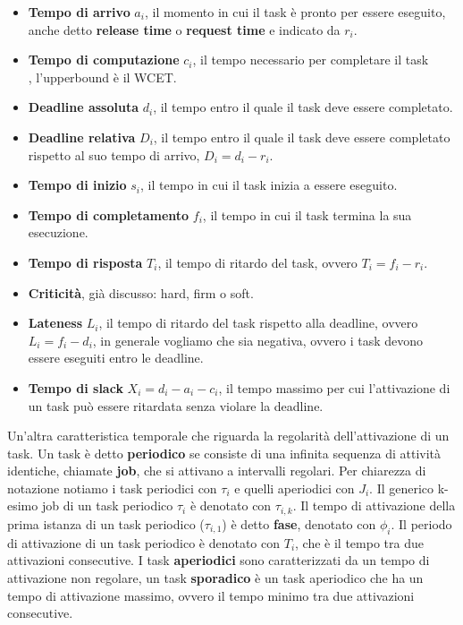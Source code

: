 \documentclass[12pt,openany,onesided]{book}
\begin{document}
\begin{itemize}
    \item \textbf{Tempo di arrivo} $a_i$, il momento in cui il task è pronto per essere eseguito, anche detto \textbf{release time} o \textbf{request time} e indicato da $r_i$.
    \item \textbf{Tempo di computazione} $c_i$, il tempo necessario per completare il task\\ , l'upperbound è il WCET.
    \item \textbf{Deadline assoluta} $d_i$, il tempo entro il quale il task deve essere completato.
    \item \textbf{Deadline relativa} $D_i$, il tempo entro il quale il task deve essere completato rispetto al suo tempo di arrivo, $D_i=d_i-r_i$.
    \item \textbf{Tempo di inizio} $s_i$, il tempo in cui il task inizia a essere eseguito.
    \item \textbf{Tempo di completamento} $f_i$, il tempo in cui il task termina la sua esecuzione.
    \item \textbf{Tempo di risposta} $T_i$, il tempo di ritardo del task, ovvero $T_i=f_i-r_i$.
    \item \textbf{Criticità}, già discusso: hard, firm o soft.
    \item \textbf{Lateness} $L_i$, il tempo di ritardo del task rispetto alla deadline, ovvero $L_i=f_i-d_i$, in generale vogliamo che sia negativa, ovvero i task devono essere eseguiti entro le deadline.
    \item \textbf{Tempo di slack} $X_i=d_i-a_i-c_i$, il tempo massimo per cui l'attivazione di un task può essere ritardata senza violare la deadline.
\end{itemize}
Un'altra caratteristica temporale che riguarda la regolarità dell'attivazione di un task.
Un task è detto \textbf{periodico} se consiste di una infinita sequenza di attività identiche, chiamate \textbf{job}, che si attivano a intervalli regolari.
Per chiarezza di notazione notiamo i task periodici con $\tau_i$ e quelli aperiodici con $J_i$. Il generico k-esimo job di un task periodico $\tau_i$ è denotato con $\tau_{i,k}$.
Il tempo di attivazione della prima istanza di un task periodico ($\tau_{i,1}$) è detto \textbf{fase}, denotato con $\phi_i$.
Il periodo di attivazione di un task periodico è denotato con $T_i$, che è il tempo tra due attivazioni consecutive.
I task \textbf{aperiodici} sono caratterizzati da un tempo di attivazione non regolare, un task \textbf{sporadico} è un task aperiodico che ha un tempo di attivazione massimo, ovvero il tempo minimo tra due attivazioni consecutive.\\
\end{document}
